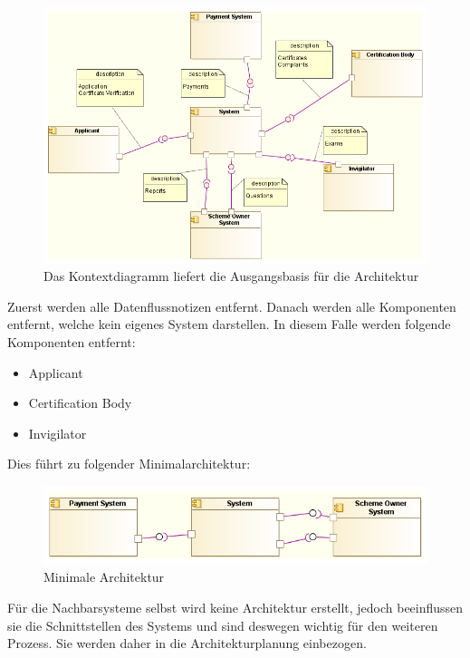 \begin{figure}[H]
    \centering
    \includegraphics[scale=0.5]{uml/context.png}
    \caption{Das Kontextdiagramm liefert die Ausgangsbasis für die Architektur}
\end{figure}

Zuerst werden alle Datenflussnotizen entfernt. Danach werden alle Komponenten entfernt, welche kein eigenes System darstellen. In diesem Falle werden folgende Komponenten entfernt:

\begin{itemize}
  \item Applicant
  \item Certification Body
  \item Invigilator
\end{itemize}

Dies führt zu folgender Minimalarchitektur:

\begin{figure}[H]
    \centering
    \includegraphics[scale=0.7]{uml/minimalarch.png}
    \caption{Minimale Architektur}
\end{figure}

Für die Nachbarsysteme selbst wird keine Architektur erstellt, jedoch beeinflussen sie die Schnittstellen des Systems und sind deswegen wichtig für den weiteren Prozess. Sie werden daher in die Architekturplanung einbezogen.

